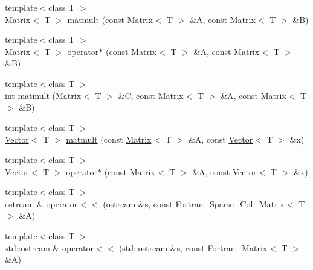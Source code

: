 \begin{DoxyCompactItemize}
\item 
{\footnotesize template$<$class T $>$ }\\\hyperlink{class_t_n_t_1_1_matrix}{Matrix}$<$ T $>$ \hyperlink{namespace_t_n_t_ad2ac1ae6c8d6dfdbdc22e63bc03700d7}{matmult} (const \hyperlink{class_t_n_t_1_1_matrix}{Matrix}$<$ T $>$ \&A, const \hyperlink{class_t_n_t_1_1_matrix}{Matrix}$<$ T $>$ \&B)
\item 
{\footnotesize template$<$class T $>$ }\\\hyperlink{class_t_n_t_1_1_matrix}{Matrix}$<$ T $>$ \hyperlink{namespace_t_n_t_ac7d0ba2e0a49b98ca66bb673b65bebcf}{operator$\ast$} (const \hyperlink{class_t_n_t_1_1_matrix}{Matrix}$<$ T $>$ \&A, const \hyperlink{class_t_n_t_1_1_matrix}{Matrix}$<$ T $>$ \&B)
\item 
{\footnotesize template$<$class T $>$ }\\int \hyperlink{namespace_t_n_t_ab150bc9116fc808e59075bc0748e0e3c}{matmult} (\hyperlink{class_t_n_t_1_1_matrix}{Matrix}$<$ T $>$ \&C, const \hyperlink{class_t_n_t_1_1_matrix}{Matrix}$<$ T $>$ \&A, const \hyperlink{class_t_n_t_1_1_matrix}{Matrix}$<$ T $>$ \&B)
\item 
{\footnotesize template$<$class T $>$ }\\\hyperlink{class_t_n_t_1_1_vector}{Vector}$<$ T $>$ \hyperlink{namespace_t_n_t_ae8ef3b83f0c645ffb3c5db9d653e0625}{matmult} (const \hyperlink{class_t_n_t_1_1_matrix}{Matrix}$<$ T $>$ \&A, const \hyperlink{class_t_n_t_1_1_vector}{Vector}$<$ T $>$ \&x)
\item 
{\footnotesize template$<$class T $>$ }\\\hyperlink{class_t_n_t_1_1_vector}{Vector}$<$ T $>$ \hyperlink{namespace_t_n_t_a34f973c4d8e918b55ff43d661151fa3d}{operator$\ast$} (const \hyperlink{class_t_n_t_1_1_matrix}{Matrix}$<$ T $>$ \&A, const \hyperlink{class_t_n_t_1_1_vector}{Vector}$<$ T $>$ \&x)
\item 
{\footnotesize template$<$class T $>$ }\\ostream \& \hyperlink{namespace_t_n_t_aabe10faab5f25861605faea3a85ab948}{operator$<$$<$} (ostream \&s, const \hyperlink{class_t_n_t_1_1_fortran___sparse___col___matrix}{Fortran\_\-Sparse\_\-Col\_\-Matrix}$<$ T $>$ \&A)
\item 
{\footnotesize template$<$class T $>$ }\\std::ostream \& \hyperlink{namespace_t_n_t_a0d9e650ba1ab4e1b962aa3b1b98de019}{operator$<$$<$} (std::ostream \&s, const \hyperlink{class_t_n_t_1_1_fortran___matrix}{Fortran\_\-Matrix}$<$ T $>$ \&A)
\item 

\end{DoxyCompactItemize}
